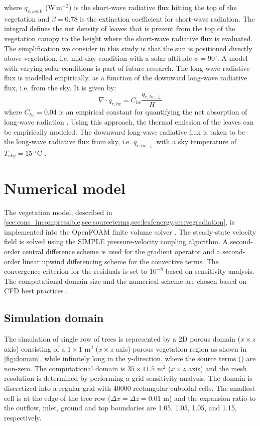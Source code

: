 where $q_{r,sw,0}$ (W\,m$^{-2}$) is the short-wave radiative flux hitting the top of the vegetation and $\beta=0.78$ is the extinction coefficient for short-wave radiation. The integral defines the net density of leaves that is present from the top of the vegetation canopy to the height where the short-wave radiative flux is evaluated. The simplification we consider in this study is that the sun is positioned directly above vegetation, i.e. mid-day condition with a solar altitude $\phi=90^{\circ}$. A model with varying solar conditions is part of future research. The long-wave radiative flux is modelled empirically, as a function of the downward long-wave radiative flux, i.e. from the sky. It is given by:
\begin{equation}
\nabla  \cdot {q_{\mathit{r,lw}}} = {C_{\mathit{lw}}}\frac{{{q_{\mathit{r,lw,} \downarrow }}}}{H}
\end{equation}
where $C_{lw}=0.04$ is an empirical constant for quantifying the net absorption of long-wave radiation \citep{Kichah2012}. Using this approach, the thermal emission of the leaves can be empirically modeled. The downward long-wave radiative flux is taken to be the long-wave radiative flux from sky, i.e. ${q_{\mathit{r,lw,} \downarrow }}$ with a sky temperature of $T_{\mathit{sky}}=15$ $^{\circ}$C \citep{Saneinejad2014}.

\section{Numerical model}

The vegetation model, described in \cref{sec:cons_incompressible,sec:sourceterms,sec:leafenergy,sec:vegradiation}, is implemented into the OpenFOAM finite volume solver \citep{Weller1998a}. The steady-state velocity field is solved using the SIMPLE pressure-velocity coupling algorithm. A second-order central difference scheme is used for the gradient operator and a second-order linear upwind differencing scheme for the convective terms. The convergence criterion for the residuals is set to $10^{-8}$ based on sensitivity analysis. The computational domain size and the numerical scheme are chosen based on CFD best practices \citep{Blocken2015, Franke2007, Tominaga2008}.

\subsection{Simulation domain}
The simulation of single row of trees is represented by a 2D porous domain ($x\times z$ axis) consisting of a $1\times1$ m$^2$ ($x\times z$ axis) porous vegetation region as shown in \cref{fig:domain}, while infinitely long in the y-direction, where the source terms () are non-zero. The computational domain is $35\times11.5$ m$^2$ ($x\times z$ axis) and the mesh resolution is determined by performing a grid sensitivity analysis. The domain is discretized into a regular grid with \num{40000} rectangular cuboidal cells. The smallest cell is at the edge of the tree row ($\Delta x = \Delta z = 0.01$ m) and the expansion ratio to the outflow, inlet, ground and top boundaries are 1.05, 1.05, 1.05, and 1.15, respectively. 

